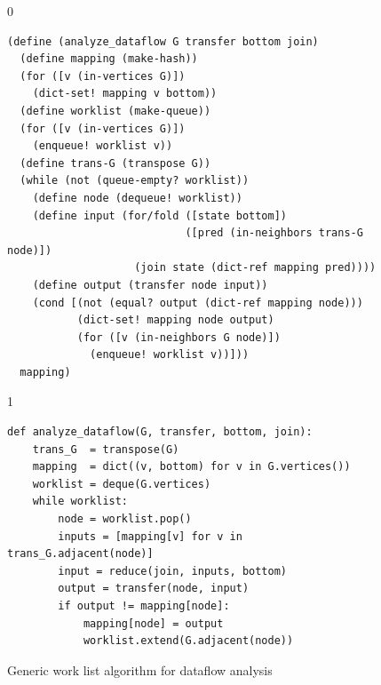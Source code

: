 \documentclass[7x10]{TimesAPriori_MIT}%
\def\racketEd{0}
\def\pythonEd{1}
\def\edition{0}
\numberwithin{theorem}{chapter}
\numberwithin{definition}{chapter}
\numberwithin{equation}{chapter}
\begin{document}
\begin{figure}[tb]
\begin{tcolorbox}[colback=white]  
{\if\edition\racketEd    
\begin{lstlisting}
(define (analyze_dataflow G transfer bottom join)
  (define mapping (make-hash))
  (for ([v (in-vertices G)])
    (dict-set! mapping v bottom))
  (define worklist (make-queue))
  (for ([v (in-vertices G)])
    (enqueue! worklist v))
  (define trans-G (transpose G))
  (while (not (queue-empty? worklist))
    (define node (dequeue! worklist)) 
    (define input (for/fold ([state bottom])
                            ([pred (in-neighbors trans-G node)])
                    (join state (dict-ref mapping pred))))
    (define output (transfer node input))
    (cond [(not (equal? output (dict-ref mapping node)))
           (dict-set! mapping node output)
           (for ([v (in-neighbors G node)])
             (enqueue! worklist v))]))
  mapping)
\end{lstlisting}
\fi}
{\if\edition\pythonEd
\begin{lstlisting}
def analyze_dataflow(G, transfer, bottom, join):
    trans_G  = transpose(G)
    mapping  = dict((v, bottom) for v in G.vertices())
    worklist = deque(G.vertices)
    while worklist:
        node = worklist.pop()
        inputs = [mapping[v] for v in trans_G.adjacent(node)]
        input = reduce(join, inputs, bottom)
        output = transfer(node, input)
        if output != mapping[node]:
            mapping[node] = output
            worklist.extend(G.adjacent(node))
\end{lstlisting}
\fi}
\end{tcolorbox}

\caption{Generic work list algorithm for dataflow analysis}
  \label{fig:generic-dataflow}
\end{figure}
\end{document}
